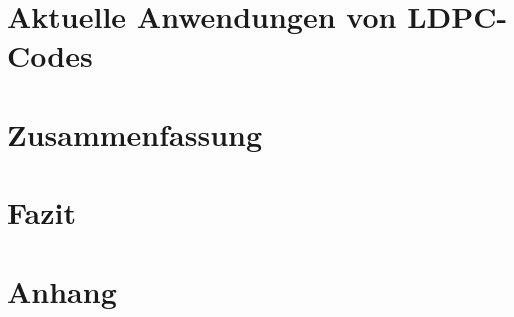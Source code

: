 \documentclass[10pt]{report}
\begin{document}
\tableofcontents
\listoffigures
\listoftables







\chapter{Aktuelle Anwendungen von LDPC-Codes}

\chapter{Zusammenfassung}

\chapter{Fazit}

\printbibliography
\appendix
\chapter{Anhang}

\end{document}
